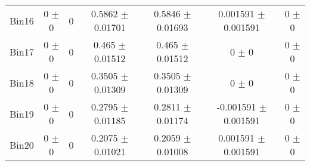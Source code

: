 \begin{tabular}{@{\extracolsep{4pt}}lcccccc@{}}
     Bin16 & 0 $\pm$ 0 & 0 & 0.5862 $\pm$ 0.01701 & 0.5846 $\pm$ 0.01693 & 0.001591 $\pm$ 0.001591 & 0 $\pm$ 0 \\ 
     Bin17 & 0 $\pm$ 0 & 0 & 0.465 $\pm$ 0.01512 & 0.465 $\pm$ 0.01512 & 0 $\pm$ 0 & 0 $\pm$ 0 \\ 
     Bin18 & 0 $\pm$ 0 & 0 & 0.3505 $\pm$ 0.01309 & 0.3505 $\pm$ 0.01309 & 0 $\pm$ 0 & 0 $\pm$ 0 \\ 
     Bin19 & 0 $\pm$ 0 & 0 & 0.2795 $\pm$ 0.01185 & 0.2811 $\pm$ 0.01174 & -0.001591 $\pm$ 0.001591 & 0 $\pm$ 0 \\ 
     Bin20 & 0 $\pm$ 0 & 0 & 0.2075 $\pm$ 0.01021 & 0.2059 $\pm$ 0.01008 & 0.001591 $\pm$ 0.001591 & 0 $\pm$ 0 \\ 
\hline\hline
  \end{tabular}
